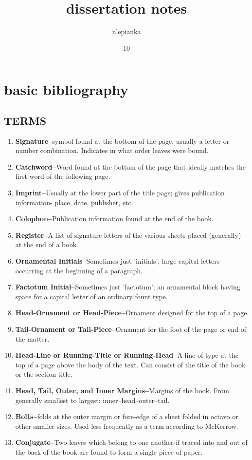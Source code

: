 \documentclass[course, english]{Notes}
\title{dissertation notes}
\author{nlepianka}
\date{10}{12}{2016}
\begin{document}
\section{basic bibliography}
\subsection{TERMS}
\begin{enumerate}
\item \textbf{Signature--}symbol found at the bottom of the page, usually a letter or number combination. Indicates in what order leaves were bound.
\item \textbf{Catchword--}Word found at the bottom of the page that ideally matches the first word of the following page. 
\item \textbf{Imprint--}Usually at the lower part of the title page; gives publication information- place, date, publisher, etc.
\item \textbf{Colophon--}Publication information found at the end of the book.
\item \textbf{Register--}A list of signature-letters of the various sheets placed (generally) at the end of a book
\item \textbf{Ornamental Initials--}Sometimes just 'initials'; large capital letters occurring at the beginning of a paragraph.
\item \textbf{Factotum Initial--}Sometimes just 'factotum'; an ornamental block having space for a capital letter of an ordinary fount type.
\item \textbf{Head-Ornament or Head-Piece--}Ornament designed for the top of a page.
\item \textbf{Tail-Ornament or Tail-Piece--}Ornament for the foot of the page or end of the matter.
\item \textbf{Head-Line or Running-Title or Running-Head--}A line of type at the top of a page above the body of the text. Can consist of the title of the book or the section title.
\item \textbf{Head, Tail, Outer, and Inner Margins--}Margins of the book. From generally smallest to largest: inner--head--outer--tail.  
\item \textbf{Bolts--}folds at the outer margin or fore-edge of a sheet folded in octavo or other smaller sizes. Used less frequently as a term according to McKerrow.
\item \textbf{Conjugate--}Two leaves which belong to one another-if traced into and out of the back of the book are found to form a single piece of paper. 

\end{enumerate}
\end{document}
